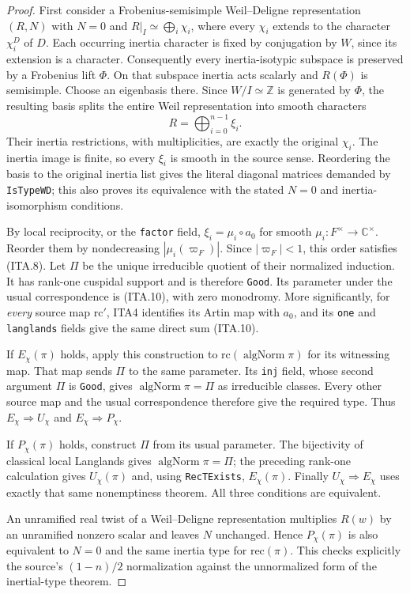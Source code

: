 \begin{proof}
First consider a Frobenius-semisimple Weil--Deligne
representation $(R,N)$ with $N=0$ and
$R|_I\simeq\bigoplus_i\chi_i$, where every $\chi_i$
extends to the character $\chi_i^D$ of $D$.
Each occurring inertia character is fixed by conjugation
by $W$, since its extension is a character.  Consequently
every inertia-isotypic subspace is preserved by a
Frobenius lift $\Phi$.  On that subspace inertia acts
scalarly and $R(\Phi)$ is semisimple.  Choose an eigenbasis
there.  Since $W/I\simeq\mathbb Z$ is generated by
$\Phi$, the resulting basis splits the entire Weil
representation into smooth characters
\[
                            R=\bigoplus_{i=0}^{n-1}\xi_i.
                                                               \tag{ITA.10}
\]
Their inertia restrictions, with multiplicities, are exactly
the original $\chi_i$.  The inertia image is finite, so
every $\xi_i$ is smooth in the source sense.  Reordering
the basis to the original inertia list gives the literal
diagonal matrices demanded by \texttt{IsTypeWD}; this
also proves its equivalence with the stated $N=0$
and inertia-isomorphism conditions.

By local reciprocity, or the \texttt{factor} field,
$\xi_i=\mu_i\circ a_0$ for smooth $\mu_i:F^\times\to
\mathbb C^\times$.  Reorder them by nondecreasing
$|\mu_i(\varpi_F)|$.  Since $|\varpi_F|<1$, this order
satisfies (ITA.8).  Let $\Pi$ be the unique irreducible
quotient of their normalized induction.  It has rank-one
cuspidal support and is therefore \texttt{Good}.  Its
parameter under the usual correspondence is (ITA.10),
with zero monodromy.  More significantly, for \emph{every}
source map $\mathrm{rc}'$, ITA4 identifies its Artin map
with $a_0$, and its \texttt{one} and \texttt{langlands}
fields give the same direct sum (ITA.10).

If $E_\chi(\pi)$ holds, apply this construction to
$\mathrm{rc}(\operatorname{algNorm}\pi)$ for its witnessing
map.  That map sends $\Pi$ to the same parameter.  Its
\texttt{inj} field, whose second argument $\Pi$ is
\texttt{Good}, gives
$\operatorname{algNorm}\pi=\Pi$ as irreducible classes.
Every other source map and the usual correspondence
therefore give the required type.  Thus
$E_\chi\Rightarrow U_\chi$ and $E_\chi\Rightarrow P_\chi$.

If $P_\chi(\pi)$ holds, construct $\Pi$ from its usual
parameter.  The bijectivity of classical local Langlands
gives $\operatorname{algNorm}\pi=\Pi$; the preceding
rank-one calculation gives $U_\chi(\pi)$ and, using
\texttt{RecTExists}, $E_\chi(\pi)$.  Finally
$U_\chi\Rightarrow E_\chi$ uses exactly that same
nonemptiness theorem.  All three conditions are equivalent.

An unramified real twist of a Weil--Deligne representation
multiplies $R(w)$ by an unramified nonzero scalar and leaves
$N$ unchanged.  Hence $P_\chi(\pi)$ is also equivalent to
$N=0$ and the same inertia type for $\mathrm{rec}(\pi)$.
This checks explicitly the source's $(1-n)/2$ normalization
against the unnormalized form of the inertial-type theorem.
\end{proof}

